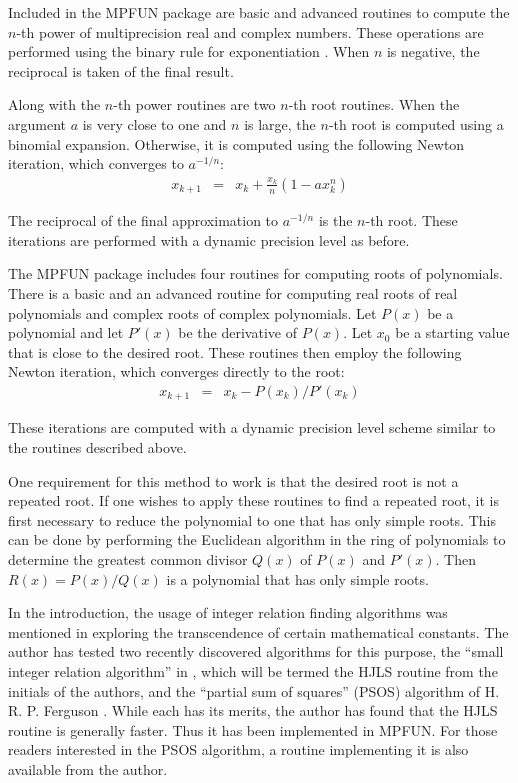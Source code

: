 Included in the MPFUN package are basic and advanced routines to
compute the $n$-th power of multiprecision real and complex numbers.
These operations are performed using the binary rule for
exponentiation \cite{knuth}.  When $n$ is negative, the reciprocal is
taken of the final result.

Along with the $n$-th power routines are two $n$-th root routines.
When the argument $a$ is very close to one and $n$ is large, the
$n$-th root is computed using a binomial expansion.  Otherwise, it is
computed using the following Newton iteration, which converges to
$a^{-1/n}$:
\begin{eqnarray*}
x_{k+1} &=& x_k + \frac{x_k}{n} (1 - a x_k^n)
\end{eqnarray*}

\noindent
The reciprocal of the final approximation to $a^{-1/n}$ is the $n$-th
root.  These iterations are performed with a dynamic precision level
as before.

The MPFUN package includes four routines for computing roots of
polynomials.  There is a basic and an advanced routine for
computing real roots of real polynomials and complex roots of complex
polynomials.  Let $P(x)$ be a polynomial and let $P'(x)$ be the
derivative of $P(x)$.  Let $x_0$ be a starting value that is close to
the desired root.  These routines then employ the following Newton
iteration, which converges directly to the root:
\begin{eqnarray*}
x_{k+1} &=& x_k - P(x_k) / P'(x_k)
\end{eqnarray*}

\noindent
These iterations are computed with a dynamic precision level scheme
similar to the routines described above.

One requirement for this method to work is that the desired root is
not a repeated root.  If one wishes to apply these routines to find a
repeated root, it is first necessary to reduce the polynomial to one
that has only simple roots.  This can be done by performing the
Euclidean algorithm in the ring of polynomials to determine the
greatest common divisor $Q(x)$ of $P(x)$ and $P'(x)$.  Then $R(x) =
P(x)/Q(x)$ is a polynomial that has only simple roots.

In the introduction, the usage of integer relation finding algorithms
was mentioned in exploring the transcendence of certain mathematical
constants.  The author has tested two recently discovered algorithms
for this purpose, the ``small integer relation algorithm'' in
\cite{hjls}, which will be termed the HJLS routine from the initials
of the authors, and the ``partial sum of squares'' (PSOS) algorithm of
H. R. P. Ferguson \cite{dhb6}.  While each has its merits, the author
has found that the HJLS routine is generally faster.  Thus it has been
implemented in MPFUN.  For those readers interested in the PSOS
algorithm, a routine implementing it is also available from the
author.

